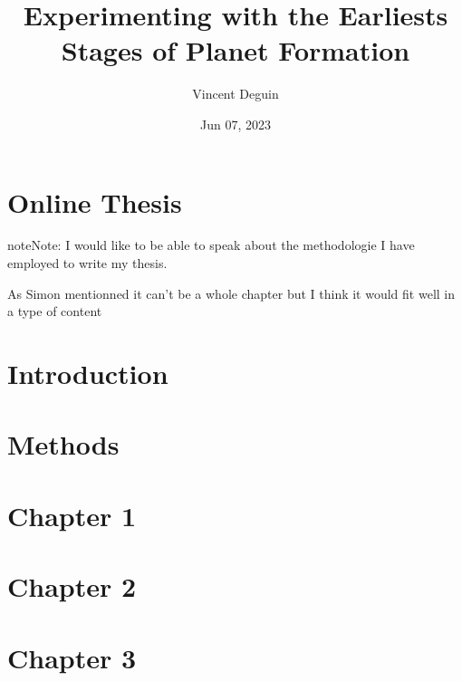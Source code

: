 \documentclass[letterpaper,10pt,english]{jupyterBook}
\title{Experimenting with the Earliests Stages of Planet Formation}
\date{Jun 07, 2023}
\author{Vincent Deguin}
\begin{document}
\pagestyle{empty}
\sphinxmaketitle
\pagestyle{plain}
\sphinxtableofcontents
\pagestyle{normal}
\label{\detokenize{intro::doc}}


\sphinxstepscope


\chapter{Online Thesis}
\label{\detokenize{Preface/Preface:online-thesis}}\label{\detokenize{Preface/Preface::doc}}
\begin{sphinxadmonition}{note}{Note:}
\sphinxAtStartPar
I would like to be able to speak about the methodologie I have employed to write my thesis.

\sphinxAtStartPar
As Simon mentionned it can’t be a whole chapter but I think it would fit well in a  type of content
\end{sphinxadmonition}

\sphinxstepscope


\chapter{Introduction}
\label{\detokenize{Introduction/Introduction:introduction}}\label{\detokenize{Introduction/Introduction::doc}}
\sphinxstepscope


\chapter{Methods}
\label{\detokenize{Methods/Methods:methods}}\label{\detokenize{Methods/Methods::doc}}
\sphinxstepscope


\chapter{Chapter 1}
\label{\detokenize{Chapter1/Chapter1:chapter-1}}\label{\detokenize{Chapter1/Chapter1::doc}}
\sphinxstepscope


\chapter{Chapter 2}
\label{\detokenize{Chapter2/Chapter2:chapter-2}}\label{\detokenize{Chapter2/Chapter2::doc}}
\sphinxstepscope


\chapter{Chapter 3}
\label{\detokenize{Chapter3/Chapter3:chapter-3}}\label{\detokenize{Chapter3/Chapter3::doc}}
\sphinxstepscope
\end{document}
